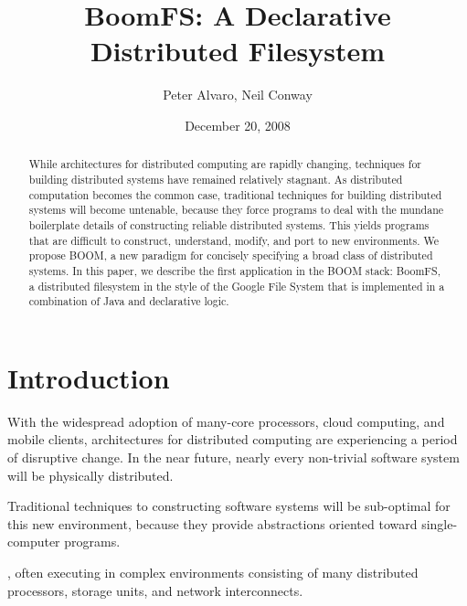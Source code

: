 \documentclass{article}
\title{BoomFS: A Declarative Distributed Filesystem}
\author{Peter Alvaro, Neil Conway}
\date{December 20, 2008}
\begin{document}
\maketitle
\begin{abstract}
  While architectures for distributed computing are rapidly changing,
  techniques for building distributed systems have remained relatively
  stagnant. As distributed computation becomes the common case,
  traditional techniques for building distributed systems will become
  untenable, because they force programs to deal with the mundane
  boilerplate details of constructing reliable distributed
  systems. This yields programs that are difficult to construct,
  understand, modify, and port to new environments. We propose BOOM, a
  new paradigm for concisely specifying a broad class of distributed
  systems. In this paper, we describe the first application in the
  BOOM stack: BoomFS, a distributed filesystem in the style of the
  Google File System that is implemented in a combination of Java and
  declarative logic.
\end{abstract}

\section{Introduction}

With the widespread adoption of many-core processors, cloud computing,
and mobile clients, architectures for distributed computing are
experiencing a period of disruptive change. In the near future, nearly
every non-trivial software system will be physically distributed.

Traditional techniques to constructing software systems will be
sub-optimal for this new environment, because they provide
abstractions oriented toward single-computer programs. 

,
often executing in complex environments consisting of many distributed
processors, storage units, and network interconnects.
\end{document}
